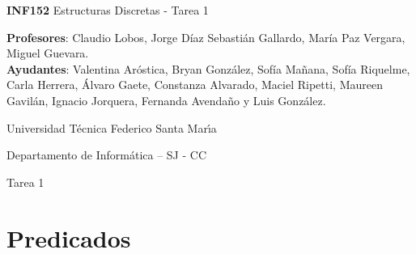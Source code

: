 \documentclass[letterpaper,10pt]{article}
\begin{document}
\thispagestyle{empty}
 	
\begin{minipage}[t]{0.6\textwidth}

{\LARGE \textbf{INF152} Estructuras Discretas - Tarea 1}

{\large \textbf{Profesores}: Claudio Lobos, Jorge Díaz Sebastián Gallardo, María Paz Vergara, Miguel Guevara.}\\
{\small \textbf{Ayudantes}: Valentina Aróstica, Bryan González, Sofía Mañana, Sofía Riquelme, Carla Herrera, Álvaro Gaete, Constanza Alvarado, Maciel Ripetti, Maureen Gavilán, Ignacio Jorquera, Fernanda Avendaño y Luis González.} 

Universidad T\'ecnica Federico Santa Mar\'{\i}a

Departamento de Inform\'atica -- SJ - CC 



\end{minipage}
\hfill



\vspace{0.3cm}


\begin{center}
    \huge Tarea 1
\end{center}


\section{Predicados}
\end{document}
